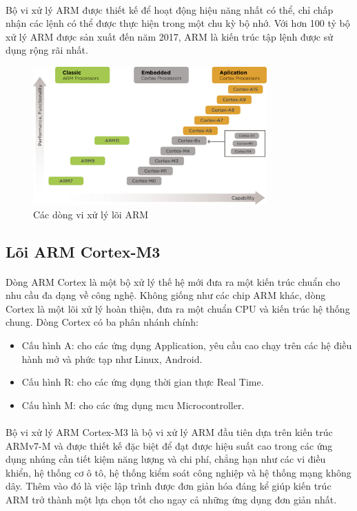 \paragraph{}
Bộ vi xử lý ARM được thiết kế để hoạt động hiệu năng nhất có thể, chỉ chấp nhận các lệnh có thể được thực hiện trong một chu kỳ bộ nhớ. Với hơn 100 tỷ bộ xử lý ARM được sản xuất đến năm 2017, ARM là kiến trúc tập lệnh được sử dụng rộng rãi nhất.
\begin{figure}[H]
    \centering
    \includegraphics[width=0.8\textwidth]{images/all-arm.jpg}
    \caption{Các dòng vi xử lý lõi ARM}
    \label{fig:enter-label}
\end{figure}
\subsection{Lõi ARM Cortex-M3}
\paragraph{}
Dòng ARM Cortex là một bộ xử lý thế hệ mới đưa ra một kiến trúc chuẩn cho nhu cầu đa dạng về công nghệ. Không giống như các chip ARM khác, dòng Cortex là một lõi xử lý hoàn thiện, đưa ra một chuẩn CPU và kiến trúc hệ thống chung. Dòng Cortex có ba phân nhánh chính:
\begin{itemize}
    \item Cấu hình A: cho các ứng dụng Application, yêu cầu cao chạy trên các hệ điều hành mở và phức tạp như Linux, Android.
    \item Cấu hình R: cho các ứng dụng thời gian thực Real Time.
    \item Cấu hình M: cho các ứng dụng \acrfull{mcu} Microcontroller.
\end{itemize}
\paragraph{}
Bộ vi xử lý ARM Cortex-M3 là bộ vi xử lý ARM đầu tiên dựa trên kiến trúc ARMv7-M và được thiết kế đặc biệt để đạt được hiệu suất cao trong các ứng dụng nhúng cần tiết kiệm năng lượng và chi phí, chẳng hạn như các vi điều khiển, hệ thống cơ ô tô, hệ thống kiểm soát công nghiệp và hệ thống mạng không dây. Thêm vào đó là việc lập trình được đơn giản hóa đáng kể giúp kiến trúc ARM trở thành một lựa chọn tốt cho ngay cả những ứng dụng đơn giản nhất.

